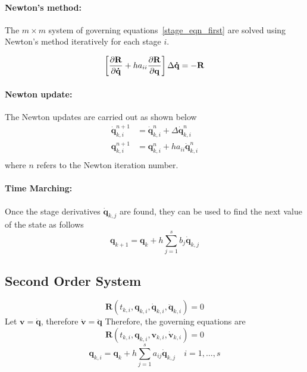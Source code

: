 \documentclass[pdftex,11pt,letter]{article}
\begin{document}
\begin{multicols}{2}
\paragraph{Newton's method:}

The $m \times m$ system of governing equations~\eqref{stage_eqn_first}
are solved using Newton's method iteratively for each stage $i$.

\begin{equation}
\left[\dfrac{\partial \mathbf{R}}{\partial \mathbf{\dot{q}}} + h a_{ii}
  \dfrac{\partial \mathbf{R}}{\partial \mathbf{q}}\right] \Delta\mathbf{\dot{q}} = -\mathbf{R}
\end{equation}

\paragraph{Newton update:}
The Newton updates are carried out as shown below
\begin{equation}\label{newton_update}
  \begin{split}
    \mathbf{\dot{q}}_{k,i}^{n+1} & = \mathbf{\dot{q}}_{k,i}^{n} +
    \Delta\mathbf{\dot{q}}_{k,i}^{n} \\
    \mathbf{q}_{k,i}^{n+1} & = \mathbf{q}_{k,i}^n + h a_{ii}
    \mathbf{\dot{q}}_{k,i}^n \\
  \end{split}
\end{equation}
where $n$ refers to the Newton iteration number.

\paragraph{Time Marching:}

Once the stage derivatives $\mathbf{\dot{q}}_{k,j}$ are found, they can
be used to find the next value of the state as follows
\begin{equation}
  \mathbf{q}_{k+1} = \mathbf{q}_{k} +h \sum_{j=1}^s b_j \mathbf{\dot{q}}_{k,j}
\end{equation}

\subsection{Second Order System}

\begin{equation}
  \mathbf{R}\left(t_{k,i}, \mathbf{q}_{k,i}, \mathbf{\dot{q}}_{k,i},
  \mathbf{\ddot{q}}_{k,i}\right) = 0
\end{equation}
Let $\mathbf{v}=\mathbf{\dot{q}}$, therefore $\mathbf{\dot{v}}=\mathbf{\ddot{q}}$
Therefore, the governing equations are
\begin{equation}
  \mathbf{R}\left(t_{k,i}, \mathbf{q}_{k,i}, \mathbf{v}_{k,i}, \mathbf{\dot{v}}_{k,i}\right) = 0
\end{equation}
\begin{equation}
  \mathbf{q}_{k,i} = \mathbf{q}_{k} + h \sum_{j=1}^s a_{ij} \mathbf{\dot{q}}_{k,j} \quad i = 1,\ldots,s 
\end{equation}


\end{multicols}
\end{document}

